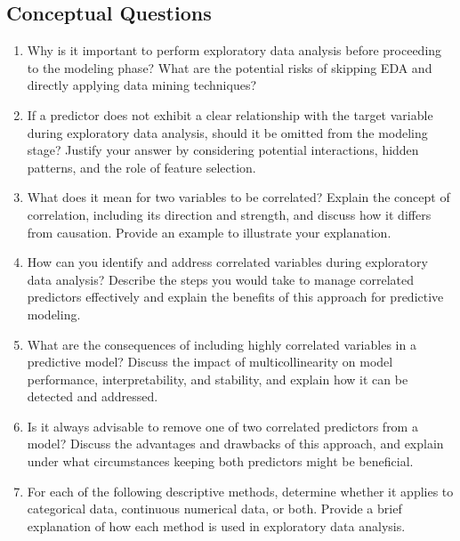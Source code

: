 \documentclass[
]{book}
\theoremstyle{definition}
\theoremstyle{definition}
\theoremstyle{definition}
\theoremstyle{definition}
\theoremstyle{remark}
\begin{document}
\subsection*{Conceptual Questions}\label{conceptual-questions}

\begin{enumerate}
\def\labelenumi{\arabic{enumi}.}
\item
  Why is it important to perform exploratory data analysis before proceeding to the modeling phase? What are the potential risks of skipping EDA and directly applying data mining techniques?
\item
  If a predictor does not exhibit a clear relationship with the target variable during exploratory data analysis, should it be omitted from the modeling stage? Justify your answer by considering potential interactions, hidden patterns, and the role of feature selection.
\item
  What does it mean for two variables to be correlated? Explain the concept of correlation, including its direction and strength, and discuss how it differs from causation. Provide an example to illustrate your explanation.
\item
  How can you identify and address correlated variables during exploratory data analysis? Describe the steps you would take to manage correlated predictors effectively and explain the benefits of this approach for predictive modeling.
\item
  What are the consequences of including highly correlated variables in a predictive model? Discuss the impact of multicollinearity on model performance, interpretability, and stability, and explain how it can be detected and addressed.
\item
  Is it always advisable to remove one of two correlated predictors from a model? Discuss the advantages and drawbacks of this approach, and explain under what circumstances keeping both predictors might be beneficial.
\item
  For each of the following descriptive methods, determine whether it applies to categorical data, continuous numerical data, or both. Provide a brief explanation of how each method is used in exploratory data analysis.


\end{enumerate}
\end{document}
